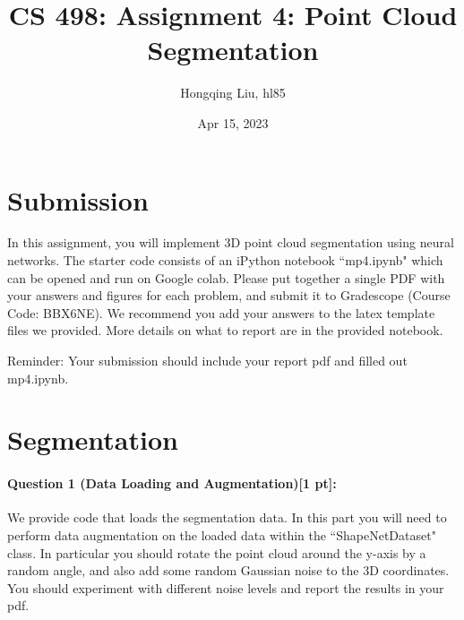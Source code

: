 \documentclass[11pt]{article}
\begin{document}
\author{Hongqing Liu, hl85}
\title{CS 498: Assignment 4: Point Cloud Segmentation}
\date{Apr 15, 2023}
\maketitle

\medskip


\section*{Submission}
In this assignment, you will implement 3D point cloud segmentation using neural networks. The starter code consists of an iPython notebook ``mp4.ipynb" which can be opened and run on Google colab. Please put together a single PDF with your answers and figures for each problem, and submit it to Gradescope (Course Code: BBX6NE). 
We recommend you add your answers to the latex template files we provided. More details on what to report are in the provided notebook. 

Reminder: Your submission should include your report pdf and filled out mp4.ipynb.

\section*{Segmentation} 

\paragraph{Question 1 (Data Loading and Augmentation)[1 pt]:}
We provide code that loads the segmentation data. In this part you will need to perform data augmentation on the loaded data within the ``ShapeNetDataset" class. In particular you should rotate the point cloud around the y-axis by a random angle, and also add some random Gaussian noise to the 3D coordinates. You should experiment with different noise levels and report the results in your pdf.
\end{document}

